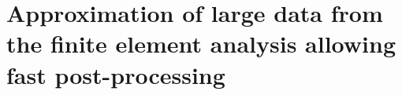 \chapter{Approximation of large data from the finite element analysis allowing fast post-processing}
\label{AppendixB}
